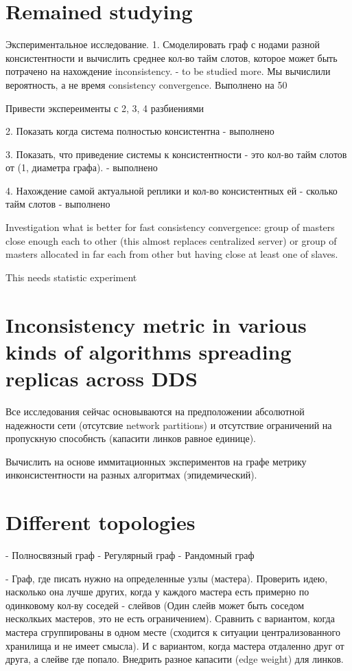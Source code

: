 \documentclass{llncs}
\begin{document}
\section{Remained studying}\label{sec:experiments}

Экспериментальное исследование.
1. Смоделировать граф с нодами разной консистентности и вычислить среднее кол-во тайм слотов, которое может быть потрачено на нахождение inconsistency. - to be studied more. Мы вычислили вероятность, а не время consistency convergence. Выполнено на 50%

Привести экспереименты с 2, 3, 4 разбиениями

2. Показать когда система полностью консистентна - выполнено

3. Показать, что приведение системы к консистентности - это кол-во тайм слотов от (1, диаметра графа). - выполнено

4. Нахождение самой актуальной реплики и кол-во консистентных ей - сколько тайм слотов - выполнено

Investigation what is better for fast consistency convergence:
group of masters close enough each to other (this almost replaces centralized server)
or group of masters allocated in far each from other but having close at least one of slaves.

This needs statistic experiment

\section{Inconsistency metric in various kinds of algorithms spreading replicas across DDS}
Все исследования сейчас основываются на предположении абсолютной надежности сети (отсутсвие network partitions) и отсутствие ограничений на пропускную способнсть (капасити линков равное единице).

Вычислить на основе иммитационных экспериментов на графе метрику инконсистентности на разных алгоритмах (эпидемический).

\section{Different topologies}
- Полносвязный граф
- Регулярный граф
- Рандомный граф

- Граф, где писать нужно на определенные узлы (мастера). Проверить идею, насколько она лучше других, когда у каждого мастера есть примерно по одинковому кол-ву соседей - слейвов (Один слейв может быть соседом несколкьих мастеров, это не есть ограничением). Сравнить с вариантом, когда мастера сгруппированы в одном месте (сходится к ситуации централизованного хранилища и не имеет смысла). И с вариантом, когда мастера отдаленно друг от друга, а слейве где попало.
Внедрить разное капасити (edge weight) для линков.
\end{document}
